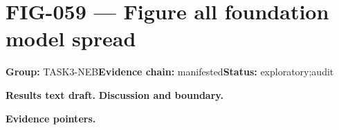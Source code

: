 \clearpage
\section{FIG-059 --- Figure all foundation model spread}
\label{figpage:fig-059}
\textbf{Group:} TASK3-NEB\quad \textbf{Evidence chain:} manifested\quad \textbf{Status:} exploratory;audit

\textbf{Results text draft.} 
\textbf{Discussion and boundary.} 


\textbf{Evidence pointers.}



\vfill
